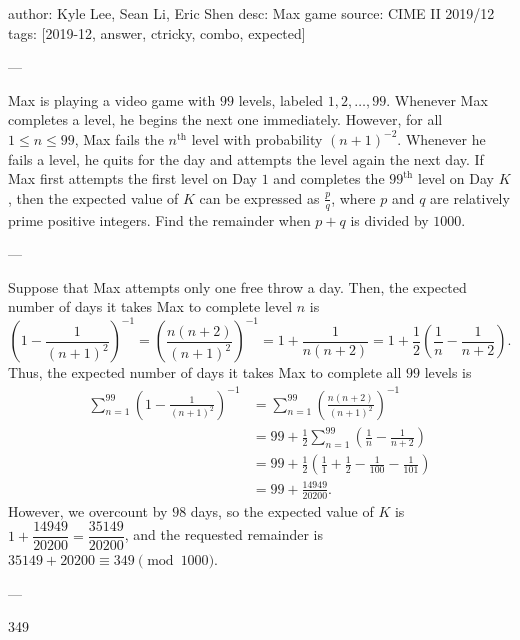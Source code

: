 author: Kyle Lee, Sean Li, Eric Shen
desc: Max game
source: CIME II 2019/12
tags: [2019-12, answer, ctricky, combo, expected]

---

Max is playing a video game with $99$ levels, labeled $1,2,\ldots,99$. Whenever Max completes a level, he begins the next one immediately. However, for all $1\le n\le 99$, Max fails the $n^\text{th}$ level with probability $(n+1)^{-2}$. Whenever he fails a level, he quits for the day and attempts the level again the next day. If Max first attempts the first level on Day $1$ and completes the $99^\text{th}$ level on Day $K$, then the expected value of $K$ can be expressed as $\tfrac pq$, where $p$ and $q$ are relatively prime positive integers. Find the remainder when $p+q$ is divided by $1000$.

---

Suppose that Max attempts only one free throw a day. Then, the expected number of days it takes Max to complete level $n$ is \[\left(1-\frac1{(n+1)^2}\right)^{-1}=\left(\frac{n(n+2)}{(n+1)^2}\right)^{-1}=1+\frac1{n(n+2)}=1+\frac12\left(\frac1n-\frac1{n+2}\right).\]
Thus, the expected number of days it takes Max to complete all $99$ levels is
\begin{align*}
    \sum_{n=1}^{99}\left(1-\frac1{(n+1)^2}\right)^{-1}&=\sum_{n=1}^{99}\left(\frac{n(n+2)}{(n+1)^2}\right)^{-1}\\
    &=99+\frac12\sum_{n=1}^{99}\left(\frac1n-\frac1{n+2}\right)\\
    &=99+\frac12\left(\frac11+\frac12-\frac1{100}-\frac1{101}\right)\\
    &=99+\frac{14949}{20200}.
\end{align*}
However, we overcount by $98$ days, so the expected value of $K$ is $1+\dfrac{14949}{20200}=\dfrac{35149}{20200}$, and the requested remainder is $35149+20200\equiv 349\pmod{1000}$.

---

349
